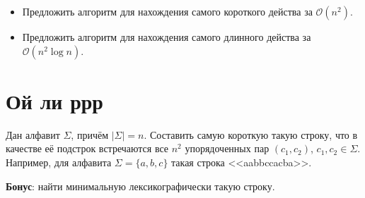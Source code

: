 \documentclass[addpoints]{exam}
\begin{document}
\begin{itemize}
\item Предложить алгоритм для нахождения самого короткого действа за $\mathcal{O}(n^2)$.
\item Предложить алгоритм для нахождения самого длинного действа за $\mathcal{O}(n^2 \log{n})$.
\end{itemize}

\section{Ой ли ррр}

Дан алфавит $\Sigma$, причём $|\Sigma| = n$. Составить самую короткую такую строку, что в качестве её подстрок встречаются все $n^2$ упорядоченных пар $(c_1, c_2)$, $c_1, c_2 \in \Sigma$. Например, для алфавита $\Sigma = \{a,b,c\}$ такая строка <<aabbccacba>>.

\textbf{Бонус}: найти минимальную лексикографически такую строку.
\end{document}
